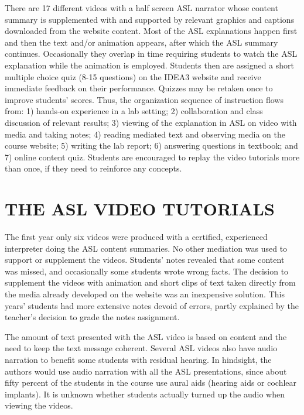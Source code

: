 \documentclass[11.5pt]{sig-alternate} %
\begin{document}
\begin{large}
There are 17 different videos with a half screen ASL narrator whose content summary is supplemented with and supported by relevant graphics and captions downloaded from the website content.  Most of the ASL explanations happen first and then the text and/or animation appears, after which the ASL summary continues.  Occasionally they overlap in time requiring students to watch the ASL explanation while the animation is employed.  Students then are assigned a short multiple choice quiz (8-15 questions) on the IDEA3 website and receive immediate feedback on their performance.  Quizzes may be retaken once to improve students’ scores.  Thus, the organization sequence of instruction flows from:  1) hands-on experience in a lab setting; 2) collaboration and class discussion of relevant results; 3) viewing of the explanation in ASL on video with media and taking notes; 4) reading mediated text and observing media on the course website; 5) writing the lab report; 6) answering questions in textbook; and 7) online content quiz.  Students are encouraged to replay the video tutorials more than once, if they need to reinforce any concepts. 
 
\section*{THE ASL VIDEO TUTORIALS }
 
The first year only six videos were produced with a certified, experienced interpreter doing the ASL content summaries.  No other mediation was used to support or supplement the videos.  Students’ notes revealed that some content was missed, and occasionally some students wrote wrong facts.  The decision to supplement the videos with animation and short clips of text taken directly from the media already developed on the website was an inexpensive solution.  This years’ students had more extensive notes devoid of errors, partly explained by the teacher’s decision to grade the notes assignment. 
 
The amount of text presented with the ASL video is based on content and the need to keep the text message coherent.  Several ASL videos also have audio narration to benefit some students with residual hearing.  In hindsight, the authors would use audio narration with all the ASL presentations, since about fifty percent of the students in the course use aural aids (hearing aids or cochlear implants).  It is unknown whether students actually turned up the audio when viewing the videos. 
 

\end{large}
\end{document}
